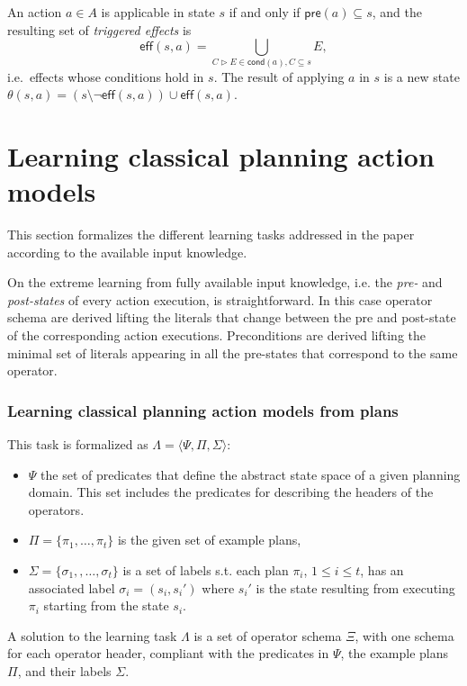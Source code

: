 \documentclass[letterpaper]{article} %
\newcommand{\tup}[1]{{\langle #1 \rangle}}
\newcommand{\pre}{\mathsf{pre}}     %
\newcommand{\eff}{\mathsf{eff}}     %
\newcommand{\cond}{\mathsf{cond}}   %
\begin{document}
An action $a\in A$ is applicable in state $s$ if and only if $\pre(a)\subseteq s$, and the resulting set of {\em triggered effects} is
\[
\eff(s,a)=\bigcup_{C\rhd E\in\cond(a),C\subseteq s} E,
\]
i.e.~effects whose conditions hold in $s$. The result of applying $a$ in $s$ is a new state $\theta(s,a)=(s\setminus \neg\eff(s,a))\cup\eff(s,a)$.


\section{Learning classical planning action models}
This section formalizes the different learning tasks addressed in the paper according to the available input knowledge.

On the extreme learning from fully available input knowledge, i.e. the {\em pre-} and {\em post-states} of every action execution, is straightforward. In this case operator schema are derived lifting the literals that change between the pre and post-state of the corresponding action executions. Preconditions are derived lifting the minimal set of literals appearing in all the pre-states that correspond to the same operator.

\subsubsection{Learning classical planning action models from plans}
This task is formalized as $\Lambda=\tup{\Psi,\Pi,\Sigma}$: 
\begin{itemize}
\item $\Psi$ the set of predicates that define the abstract state space of a given planning domain. This set includes the predicates for describing the headers of the operators.
\item $\Pi=\{\pi_1,\ldots,\pi_t\}$ is the given set of example plans,
\item $\Sigma=\{\sigma_1,,\ldots,\sigma_t\}$ is a set of labels s.t. each plan $\pi_i$, {\small $1\leq i\leq t$}, has an associated label $\sigma_i=(s_i,s_i')$ where $s_i'$ is the state resulting from executing $\pi_i$ starting from the state $s_i$. 
\end{itemize}

A solution to the learning task $\Lambda$ is a set of operator schema $\Xi$, with one schema for each operator header, compliant with the predicates in $\Psi$, the example plans $\Pi$, and their labels $\Sigma$.

\end{document}
